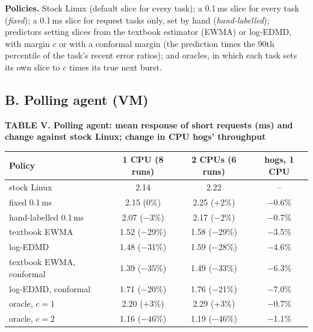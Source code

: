 \documentclass{article}
\begin{document}
\textbf{Policies.} Stock Linux (default slice for every task); a 0.1\,ms slice for every task (\emph{fixed}); a 0.1\,ms slice for request tasks only, set by hand (\emph{hand-labelled}); predictors setting slices from the textbook estimator (EWMA) or log-EDMD, with margin $c$ or with a conformal margin (the prediction times the 90th percentile of the task's recent error ratios); and oracles, in which each task sets its own slice to $c$ times its true next burst.

\subsection*{B. Polling agent (VM)}


\textbf{TABLE V. Polling agent: mean response of short requests (ms) and change against stock Linux; change in CPU hogs' throughput}




\begin{tabular}{lccc}
\toprule
Policy & 1 CPU (8 runs) & 2 CPUs (6 runs) & hogs, 1 CPU \\
\midrule
stock Linux & 2.14 & 2.22 & -- \\
fixed 0.1\,ms & 2.15 (0\%) & 2.25 (+2\%) & −0.6\% \\
hand-labelled 0.1\,ms & 2.07 (−3\%) & 2.17 (−2\%) & −0.7\% \\
textbook EWMA & 1.52 (−29\%) & 1.58 (−29\%) & −3.5\% \\
log-EDMD & 1.48 (−31\%) & 1.59 (−28\%) & −4.6\% \\
textbook EWMA, conformal & 1.39 (−35\%) & 1.49 (−33\%) & −6.3\% \\
log-EDMD, conformal & 1.71 (−20\%) & 1.76 (−21\%) & −7.0\% \\
oracle, $c=1$ & 2.20 (+3\%) & 2.29 (+3\%) & −0.7\% \\
oracle, $c=2$ & 1.16 (−46\%) & 1.19 (−46\%) & −1.1\% \\
\bottomrule
\end{tabular}
\end{document}
